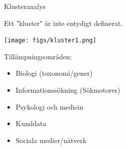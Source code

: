 \documentclass[10pt,english]{beamer}
\begin{document}
\begin{frame}{Klusteranalys}
    
    Ett "kluster" är inte entydigt definerat.

    \texttt{[image: figs/kluster1.png]}

    Tillämpningsområden:
    \begin{itemize}
        \item Biologi (toxonomi/gener)
        \item Informationssökning (Sökmotorer)
        \item Psykologi och medicin
        \item Kunddata
        \item Sociala medier/nätverk
    \end{itemize}

\end{frame}
\end{document}
